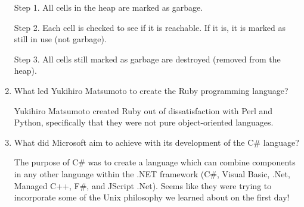\begin{enumerate}
  \begin{answer}

    Step 1. All cells in the heap are marked as garbage.

    Step 2. Each cell is checked to see if it is reachable. If it is, it is marked as still in use (not garbage).

    Step 3. All cells still marked as garbage are destroyed (removed from the heap).

    \end{answer}

  \item What led Yukihiro Matsumoto to create the Ruby programming language?

  \begin{answer}

    Yukihiro Matsumoto created Ruby out of dissatisfaction with Perl and Python, specifically that they were not pure object-oriented languages.

    \end{answer}

  \item What did Microsoft aim to achieve with its development of the
    C\# language?

  \begin{answer}

    The purpose of C\# was to create a language which can combine components in any other language within the .NET framework (C\#, Visual Basic, .Net, Managed C++, F\#, and JScript .Net). Seems like they were trying to incorporate some of the Unix philosophy we learned about on the first day!

    \end{answer}

  \end{enumerate}



